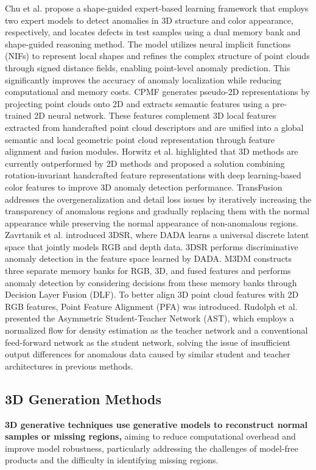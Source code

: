 \documentclass[journal,comsoc]{IEEEtran}
\begin{document}
Chu et al. propose a shape-guided expert-based learning framework that employs two expert models to detect anomalies in 3D structure and color appearance, respectively, and locates defects in test samples using a dual memory bank and shape-guided reasoning method. The model utilizes neural implicit functions (NIFs) \cite{ma2022surface} to represent local shapes and refines the complex structure of point clouds through signed distance fields, enabling point-level anomaly prediction. This significantly improves the accuracy of anomaly localization while reducing computational and memory costs. CPMF \cite{cao2024cpmf} generates pseudo-2D representations by projecting point clouds onto 2D and extracts semantic features using a pre-trained 2D neural network. These features complement 3D local features extracted from handcrafted point cloud descriptors and are unified into a global semantic and local geometric point cloud representation through feature alignment and fusion modules. Horwitz et al. \cite{horwitz2023back} highlighted that 3D methods are currently outperformed by 2D methods and proposed a solution combining rotation-invariant handcrafted feature representations with deep learning-based color features to improve 3D anomaly detection performance. TransFusion \cite{fuvcka2025transfusion} addresses the overgeneralization and detail loss issues by iteratively increasing the transparency of anomalous regions and gradually replacing them with the normal appearance while preserving the normal appearance of non-anomalous regions. Zavrtanik et al. \cite{zavrtanik20243dsr} introduced 3DSR, where DADA learns a universal discrete latent space that jointly models RGB and depth data. 3DSR performs discriminative anomaly detection in the feature space learned by DADA. M3DM constructs three separate memory banks for RGB, 3D, and fused features and performs anomaly detection by considering decisions from these memory banks through Decision Layer Fusion (DLF). To better align 3D point cloud features with 2D RGB features, Point Feature Alignment (PFA) was introduced. Rudolph et al. \cite{rudolph2023ast} presented the Asymmetric Student-Teacher Network (AST), which employs a normalized flow for density estimation as the teacher network and a conventional feed-forward network as the student network, solving the issue of insufficient output differences for anomalous data caused by similar student and teacher architectures in previous methods.

\subsection{3D Generation Methods}
\textbf{3D generative techniques use generative models to reconstruct normal samples or missing regions,} aiming to reduce computational overhead and improve model robustness, particularly addressing the challenges of model-free products and the difficulty in identifying missing regions.
\end{document}
